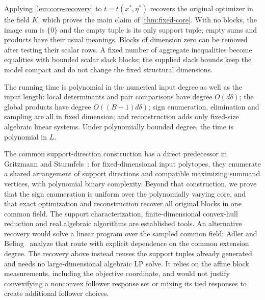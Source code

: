 Applying \cref{lem:core-recovery} to
$t=t(x^*,\eta^*)$ recovers the original optimizer in the field $K$,
which proves the main claim of \cref{thm:fixed-core}. With no blocks,
the image sum is $\{0\}$ and the empty tuple is its only support tuple;
empty sums and products have their usual meanings. Blocks of dimension
zero can be removed after testing their scalar rows. A fixed number of
aggregate inequalities become equalities with bounded scalar slack
blocks; the supplied slack bounds keep the model compact and do not
change the fixed structural dimensions.

The running time is polynomial in the numerical input degree as well as
the input length: local determinants and pair comparisons have degree
$O(d\delta)$; the global products have degree $O((B+1)d\delta)$; sign
enumeration, elimination and sampling are all in fixed dimension; and
reconstruction adds only fixed-size algebraic linear systems. Under
polynomially bounded degree, the time is polynomial in $L$.

The common support-direction construction has a direct predecessor in
Gritzmann and Sturmfels~\cite[Algorithm 2.3.6, Theorem 2.3.7, and
Corollary 2.3.10]{GritzmannSturmfels1993}: for fixed-dimensional input
polytopes, they enumerate a shared arrangement of support directions and
compatible maximizing summand vertices, with polynomial binary complexity.
Beyond that construction, we prove that the sign enumeration is uniform
over the polynomially varying core, and that exact optimization and
reconstruction recover all original blocks in one common field. The
support characterization, finite-dimensional convex-hull reduction and
real algebraic algorithms are established tools. An alternative recovery
would solve a linear program over the sampled common field; Adler and
Beling~\cite{AdlerBeling1994} analyze that route with explicit dependence
on the common extension degree. The recovery above instead reuses the
support tuples already generated and needs no large-dimensional algebraic
LP solve. It relies on the affine block measurements, including the
objective coordinate, and would not justify convexifying a nonconvex
follower response set or mixing its tied responses to create additional
follower choices.
